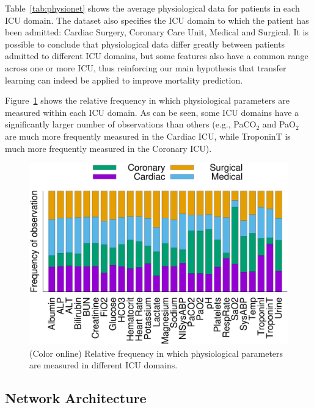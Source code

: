 Table~\ref{tab:physionet} shows the average physiological data for patients in each ICU domain. The dataset also specifies the ICU domain to which the patient has been admitted: Cardiac Surgery, Coronary Care Unit, Medical and Surgical. It is possible to conclude that physiological data differ greatly between patients admitted to different ICU domains, but some features also have a common range across one or more ICU, thus reinforcing our main hypothesis that transfer learning can indeed be applied to improve mortality prediction.  



Figure~\ref{fig:freq} shows the relative frequency in which physiological parameters are measured within each ICU domain. As can be seen, some ICU domains have a significantly larger number of observations than others (e.g., PaCO$_2$ and PaO$_2$ are much more frequently measured in the Cardiac ICU, while TroponinT is much more frequently measured in the Coronary ICU).

\begin{figure}[t]
	\begin{center}
		\includegraphics[width=1.06\linewidth]{figs/fobs}
	\end{center}
	\caption{(Color online) Relative frequency in which physiological parameters are measured in different ICU domains.}
	\label{fig:freq}
\end{figure}

\subsection{Network Architecture}

